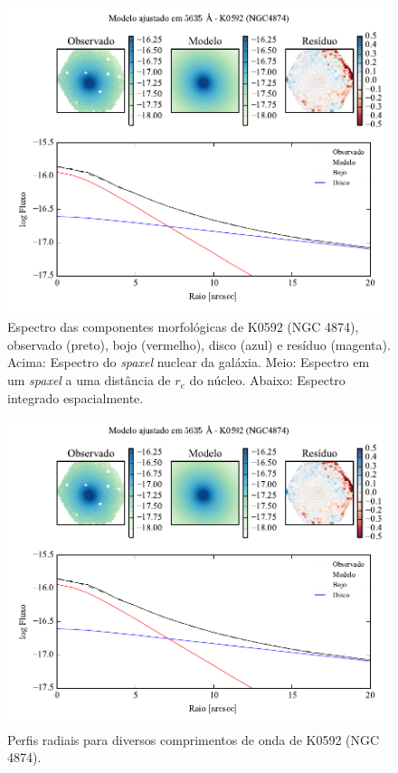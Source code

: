 \begin{figure}
	\includegraphics[page=4]{figuras-decomp/K0592_sample006a}
	\caption[Espectro das componentes morfológicas de K0592 (NGC 4874)]
	{Espectro das componentes morfológicas de K0592 (NGC 4874),
	observado (preto), bojo (vermelho), disco (azul) e resíduo (magenta). Acima:
	Espectro do {\em spaxel} nuclear da galáxia. Meio: Espectro em um {\em spaxel}
	a uma distância de $r_e$ do núcleo. Abaixo: Espectro integrado espacialmente.}
	\label{fig:decompSpectra:K0592}
\end{figure}

\begin{figure}
	\includegraphics[page=5]{figuras-decomp/K0592_sample006a}
	\caption[Perfis radiais para diversos comprimentos de onda de K0592 (NGC 4874)]
	{Perfis radiais para diversos comprimentos de onda de K0592 (NGC 4874).}
	\label{fig:decompRadprofSpec:K0592}
\end{figure}

